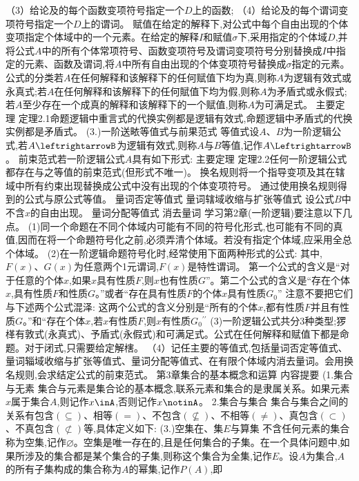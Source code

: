 （3）给论及的每个函数变项符号指定一个$D$上的函数;
（4）给论及的每个谓词变项符号指定一个$D$上的谓词。
赋值在给定的解释下,对公式中每个自由出现的个体变项指定个体域中的一个元素。在给定的解释$I$和赋值$\sigma$下,采用指定的个体域$D$,并将公式$A$中的所有个体常项符号、函数变项符号及谓词变项符号分别替换成$I$中指定的元素、函数及谓词,将$A$中所有自由出现的个体变项符号替换成$\sigma$指定的元素。
公式的分类若$A$在任何解释和该解释下的任何赋值下均为真,则称$A$为逻辑有效式或永真式;若$A$在任何解释和该解释下的任何賦值下均为假,则称$A$为矛盾式或永假式;若$A$至少存在一个成真的解释和该解释下的一个赋值,则称$A$为可满足式。
{主要定理}
定理2.1命题逻辑中重言式的代换实例都是逻辑有效式,命题逻辑中矛盾式的代换实例都是矛盾式。
{(3.)一阶送畩等值式与前果范式}
等值式设$A、B$为一阶逻辑公式,若$A\leftrightarrowB$为逻辑有效式,则称$A$与$B$等值,记作$A\LeftrightarrowB$。
前束范式若一阶逻辑公式$A$具有如下形式:
{主要定理}
定理2.2任何一阶逻辑公式都存在与之等值的前束范式(但形式不唯一)。
换名规则将一个指导变项及其在辖域中所有约束出现替换成公式中没有出现的个体变项符号。
通过使用换名规则得到的公式与原公式等值。
量词否定等值式
量词辖域收缩与扩张等值式
设公式$B$中不含$x$的自由出现。
量词分配等值式
消去量词
学习第2章(一阶逻辑)要注意以下几点。
(1)同一个命题在不同个体域内可能有不同的符号化形式,也可能有不同的真值,因而在将一个命題符号化之前,必须弄清个体域。若没有指定个体域,应采用全总个体域。
(2)在一阶逻辑命题符号化时,经常使用下面两种形式的公式:
其中,$F(x)、G(x)$为任意两个1元谓词,$F(x)$是特性谓词。
第一个公式的含义是“对于任意的个体$x$,如果$x$具有性质$F$,则$x$也有性质$G$”。第二个公式的含义是“存在个体$x$,具有性质$F$和性质$G$。”或者“存在具有性质$F$的个体$x$具有性质$G_{0}$”
注意不要把它们与下述两个公式混泽:
这两个公式的含义分别是“所有的个体$x$,都有性质$F$并且有性质$G$。”和“存在个体$x$,若$x$有性质$F$,则$x$有性质$G_{0}{}^{\prime\prime}$
(3)一阶逻辑公式共分3种类型;猡㮖有敦式(永真式)、予盾式(永假式)和可满足式。公式在任何解释和赋值下都是命题。对于闭式,只需要给定解㮫。
（4）记任主要的等值式,包括量词否定等值式、量词辎域收缩与扩张等值式、量词分配等值式、在有限个体域内消去量词。会用换名规则,会求结定公式的前束范式。
{第3章集合的基本概念和运算}
{内容提要}
{(1.集合与无素}
集合与元素是集合论的基本概念,联系元素和集合的是隶属关系。如果元素$x$属于集合$A$,则记作$x\inA$,否则记作$x\notinA$。
{2.集合与集合}
集合与集合之间的关系有包含$(\subseteq)$、相等$(=)$、不包含$(\nsubseteq)$、不相等$(\neq)$、真包含$(\subset)$、不真包含$(\not\subset)$等,具体定义如下:
(3.)空集在、集$E$与算集
不含任何元素的集合称为空集,记作$\varnothing$。空集是唯一存在的,且是任何集合的子集。在一个具体问题中,如果所涉及的集合都是某个集合的子集,则称这个集合为全集,记作$E$。设$A$为集合,$A$的所有子集构成的集合称为$A$的幂集,记作$P(A)$,即
